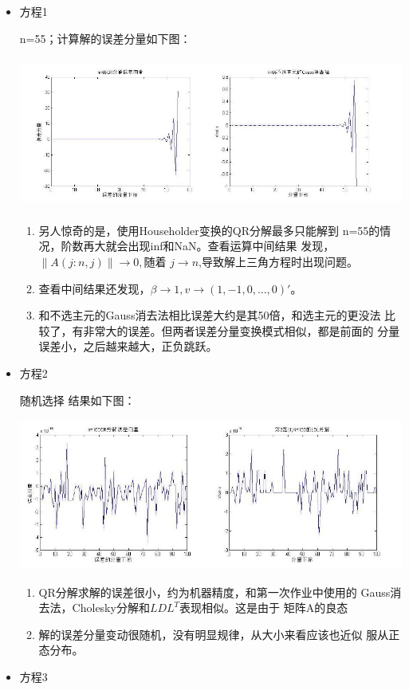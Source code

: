 \documentclass{ctexart}
\begin{document}
\begin{itemize}
\item 方程1

n=55；计算解的误差分量如下图：
\par
\centerline{\includegraphics[height=5cm,width=15cm]{1.jpg}}
\par

\begin{enumerate}
\item
另人惊奇的是，使用Householder变换的QR分解最多只能解到
n=55的情况，阶数再大就会出现inf和NaN。查看运算中间结果
发现，$\|A(j:n,j)\|\rightarrow 0,$随着 $j\rightarrow
n$,导致解上三角方程时出现问题。
\item
查看中间结果还发现，$\beta \rightarrow 1,v\rightarrow
(1,-1,0,...,0)'$。
\item
和不选主元的Gauss消去法相比误差大约是其50倍，和选主元的更没法
比较了，有非常大的误差。但两者误差分量变换模式相似，都是前面的
分量误差小，之后越来越大，正负跳跃。
\end{enumerate}

\item 方程2

随机选择 结果如下图：
\par
\centerline{\includegraphics[height=5cm,width=15cm]{2.jpg}}
\par
\begin{enumerate}
\item
QR分解求解的误差很小，约为机器精度，和第一次作业中使用的
Gauss消去法，Cholesky分解和$LDL^T$表现相似。这是由于
矩阵A的良态
\item
解的误差分量变动很随机，没有明显规律，从大小来看应该也近似
服从正态分布。
\end{enumerate}
\item 方程3


\end{itemize}
\end{document}
